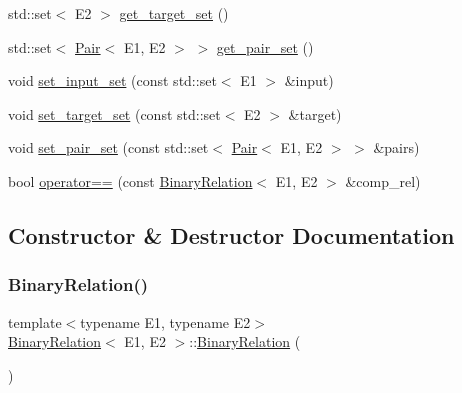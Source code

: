 \begin{DoxyCompactItemize}
\item 
std\+::set$<$ E2 $>$ \hyperlink{classBinaryRelation_a97083c4e6c05cd1838f265819b608263}{get\+\_\+target\+\_\+set} ()
\item 
std\+::set$<$ \hyperlink{classPair}{Pair}$<$ E1, E2 $>$ $>$ \hyperlink{classBinaryRelation_acd26705b6496d2db082489df739485f2}{get\+\_\+pair\+\_\+set} ()
\item 
void \hyperlink{classBinaryRelation_a0b115484a4a411d873c0b77a4958a019}{set\+\_\+input\+\_\+set} (const std\+::set$<$ E1 $>$ \&input)
\item 
void \hyperlink{classBinaryRelation_afa844b52bece82c8519bc1f90b0dcef2}{set\+\_\+target\+\_\+set} (const std\+::set$<$ E2 $>$ \&target)
\item 
void \hyperlink{classBinaryRelation_a300cf42e6c66b9fc3b2ccf1877cc9587}{set\+\_\+pair\+\_\+set} (const std\+::set$<$ \hyperlink{classPair}{Pair}$<$ E1, E2 $>$ $>$ \&pairs)
\item 
bool \hyperlink{classBinaryRelation_a8921eea825f118f12079ff73866a95b8}{operator==} (const \hyperlink{classBinaryRelation}{Binary\+Relation}$<$ E1, E2 $>$ \&comp\+\_\+rel)
\end{DoxyCompactItemize}


\subsection{Constructor \& Destructor Documentation}
\mbox{\label{classBinaryRelation_a7584a6c9b21ce062737d776b3790f30c}} 
\subsubsection{\texorpdfstring{Binary\+Relation()}{BinaryRelation()}\hspace{0.1cm}{\footnotesize\ttfamily [1/3]}}
{\footnotesize\ttfamily template$<$typename E1, typename E2$>$ \\
\hyperlink{classBinaryRelation}{Binary\+Relation}$<$ E1, E2 $>$\+::\hyperlink{classBinaryRelation}{Binary\+Relation} (\begin{DoxyParamCaption}{ }\end{DoxyParamCaption})\hspace{0.3cm}{\ttfamily [inline]}}

\mbox{\label{classBinaryRelation_a94a2796b569f98d07f1c3662ec01706d}} 
